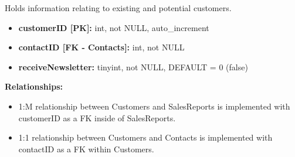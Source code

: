 \documentclass{article}
\begin{document}
\begin{tcolorbox}[colback=secondarycolor, colframe=primarycolor, title=\textbf{Customers Table}]
Holds information relating to existing and potential customers.
\vspace{0.2cm}

\begin{itemize}
  \item \textbf{customerID [PK]:} int, not NULL, auto\_increment
  \item \textbf{contactID [FK - Contacts]:} int, not NULL
  \item \textbf{receiveNewsletter:} tinyint, not NULL, DEFAULT = 0 (false)
\end{itemize}
\vspace{0.2cm}

\textbf{Relationships:}
\vspace{0.2cm}
\begin{itemize}
  \item 1:M relationship between Customers and SalesReports is implemented with customerID as a FK inside of SalesReports.
  \item 1:1 relationship between Customers and Contacts is implemented with contactID as a FK within Customers.
\end{itemize}
\end{tcolorbox}

\vspace{0.5cm}
\end{document}
